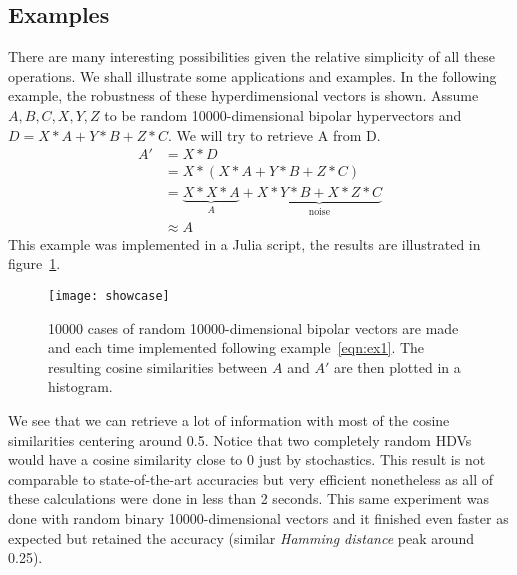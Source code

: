 \subsection{Examples}
There are many interesting possibilities given the relative simplicity of all these operations. We shall illustrate some applications and examples. 
In the following example, the robustness of these hyperdimensional vectors is shown. Assume $A, B, C, X, Y, Z$ to be random 10000-dimensional bipolar hypervectors and $D = X*A + Y*B + Z*C$. We will try to retrieve A from D.
\begin{align}
    \label{eqn:ex1}
    A' &= X * D \\
    &= X * (X * A + Y * B + Z * C) \\
    &= \underbrace{X * X * A}_A + \underbrace{X * Y * B + X * Z * C}_\text{noise} \\
    &\approx A
\end{align}
This example was implemented in a Julia script, the results are illustrated in figure~\ref{fig:exm1}.
\begin{figure}[h]
    \centering
    \texttt{[image: showcase]}
    \caption{10000 cases of random 10000-dimensional bipolar vectors are made and each time implemented following example~\ref{eqn:ex1}. The resulting cosine similarities between $A$ and $A'$ are then plotted in a histogram.}
    \label{fig:exm1}
\end{figure}

We see that we can retrieve a lot of information with most of the cosine similarities centering around 0.5. Notice that two completely random HDVs would have a cosine similarity close to 0 just by stochastics. This result is not comparable to state-of-the-art accuracies but very efficient nonetheless as all of these calculations were done in less than 2 seconds. This same experiment was done with random binary 10000-dimensional vectors and it finished even faster as expected but retained the accuracy (similar \textit{Hamming distance} peak around 0.25).